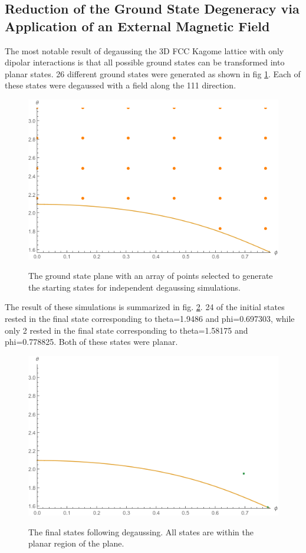 \subsection{Reduction of the Ground State Degeneracy via Application of an External Magnetic Field}

The most notable result of degaussing the 3D FCC Kagome lattice with only dipolar interactions is that all possible ground states can be transformed into planar states. 26 different ground states were generated as shown in fig \ref{fig:groundstatearray}. Each of these states were degaussed with a field along the 111 direction.

\begin{figure}[ht]
 \centering
 \includegraphics[scale=0.7]{img/predegaussed.png}
 \label{fig:groundstatearray}
 \caption{The ground state plane with an array of points selected to generate the starting states for independent degaussing simulations.}
\end{figure}
\clearpage

The result of these simulations is summarized in fig. \ref{fig:postdegaussedarray}. 24 of the initial states rested in the final state corresponding to theta=1.9486 and phi=0.697303, while only 2 rested in the final state corresponding to theta=1.58175 and phi=0.778825. Both of these states were planar. 

\begin{figure}[ht]
 \centering
 \includegraphics[scale=0.6]{img/postdegaussed.png}
 \label{fig:postdegaussedarray}
 \caption{The final states following degaussing. All states are within the planar region of the plane.}
\end{figure}